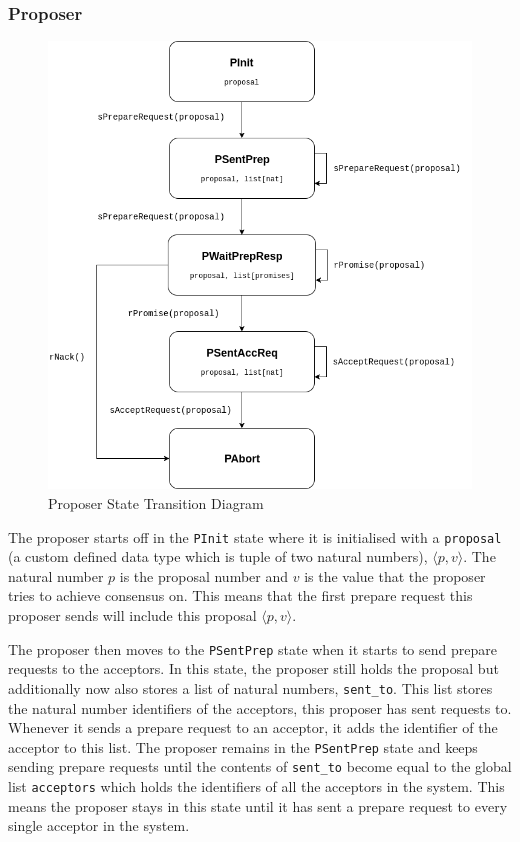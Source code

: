 \subsubsection{Proposer}
\begin{figure}
\centering
\includegraphics[width=\textwidth]{figures/proposer_state_transitions.png}
\caption{Proposer State Transition Diagram
\label{fig:myInlineFigure}}
\end{figure}

The proposer starts off in the \texttt{PInit} state where it is initialised with
a \texttt{proposal} (a custom defined data type which is tuple of two natural numbers),
$\langle p, v \rangle$.
The natural number $p$ is the proposal number and $v$ is the value that the
proposer tries to achieve consensus on. This means that the first prepare
request this proposer sends will include this proposal $\langle p, v \rangle$.

The proposer then moves to the \texttt{PSentPrep} state when it starts to send prepare
requests to the acceptors. In this state, the proposer still holds the proposal
but additionally now also stores a list of natural numbers, \texttt{sent\_to}. This list stores the
natural number identifiers of the acceptors, this proposer has sent requests to.
Whenever it sends a prepare request to an acceptor, it adds the identifier of
the acceptor to this list.
The proposer remains in the \texttt{PSentPrep} state and keeps sending prepare requests
until the contents of \texttt{sent\_to} become equal to the global list \texttt{acceptors} which
holds the identifiers of all the acceptors in the system. This means the proposer
stays in this state until it has sent a prepare request to every single acceptor
in the system.

